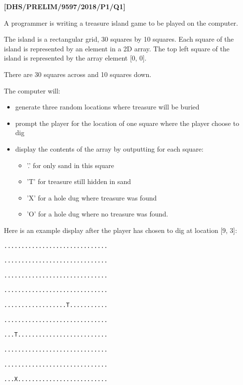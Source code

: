 \item \textbf{{[}DHS/PRELIM/9597/2018/P1/Q1{]} }

A programmer is writing a treasure island game to be played on the
computer. 

The island is a rectangular grid, 30 squares by 10 squares. Each square
of the island is represented by an element in a 2D array. The top
left square of the island is represented by the array element {[}0,
0{]}.

There are 30 squares across and 10 squares down. 

The computer will: 
\begin{itemize}
\item generate three random locations where treasure will be buried 
\item prompt the player for the location of one square where the player
choose to dig
\item display the contents of the array by outputting for each square: 
\begin{itemize}
\item '.' for only sand in this square
\item 'T' for treasure still hidden in sand 
\item 'X' for a hole dug where treasure was found
\item 'O' for a hole dug where no treasure was found. 
\end{itemize}
\end{itemize}
Here is an example display after the player has chosen to dig at location
{[}9, 3{]}: 

\noindent %
\noindent\begin{minipage}[t]{1\columnwidth}%
\texttt{.............................. }

\texttt{.............................. }

\texttt{.............................. }

\texttt{.............................. }

\texttt{..................T........... }

\texttt{.............................. }

\texttt{...T.......................... }

\texttt{.............................. }

\texttt{.............................. }

\texttt{...X..........................}%
\end{minipage}

